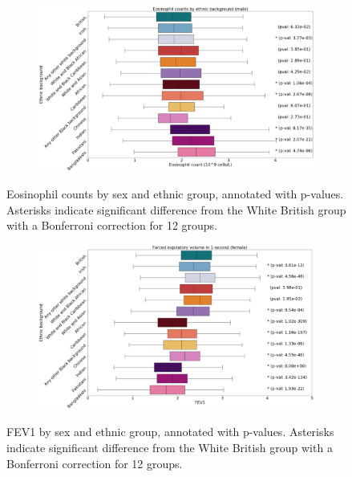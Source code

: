 \documentclass[12pt]{pnas-new}
\begin{document}
\begin{figure}
    \centering
    \begin{subfigure}{\textwidth}
    \includegraphics[width=\textwidth]{images/male_eosinophill_boxplot_annotated.pdf}
    \end{subfigure}
    \caption{Eosinophil counts by sex and ethnic group, annotated with p-values. Asterisks indicate significant difference from the White British group with a Bonferroni correction for 12 groups.}
    \label{fig:supp_box_eosinophill_m}
\end{figure}

\begin{figure}
    \centering
    \begin{subfigure}{\textwidth}
    \includegraphics[width=\textwidth]{images/female_fev_boxplot_annotated.pdf}
    \end{subfigure}
    \caption{FEV1 by sex and ethnic group, annotated with p-values. Asterisks indicate significant difference from the White British group with a Bonferroni correction for 12 groups.}
    \label{fig:supp_box_fev_f}
\end{figure}
\end{document}

